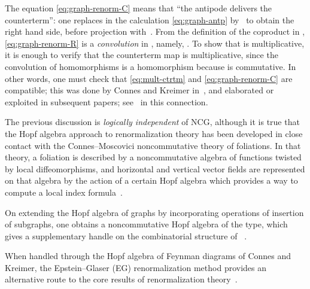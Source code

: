 \documentclass[a4paper,12pt]{article}
\providecommand{\A}{\mathcal{A}}        %
\DeclareMathOperator{\Hom}{Hom}     %
\providecommand{\1}{\mathbf{1}}         %
\providecommand{\7}{\dagger}            %
\providecommand{\8}{\bullet}            %
\renewcommand{\.}{\cdot}            %
\renewcommand{\:}{\colon}           %
\begin{document}
The equation \eqref{eq:graph-renorm-C} means that ``the antipode
delivers the counterterm'': one replaces \coordHE{} in the calculation
\eqref{eq:graph-antp} by~\coordHE{} to obtain the right hand side, before
projection with~\coordHE{}. From the definition of the coproduct in \coordHE{},
\eqref{eq:graph-renorm-R} is a \textit{convolution} in
\myHighlight{$\Hom(H_\Phi,\A)$}\coordHE{}, namely, \coordHE{}. To show that \coordHE{} is
multiplicative, it is enough to verify that the counterterm map \coordHE{} is
multiplicative, since the convolution of homomorphisms is a
homomorphism because \myHighlight{$\A$}\coordHE{} is commutative. In other words, one must
check that \eqref{eq:mult-ctrtm} and \eqref{eq:graph-renorm-C} are
compatible; this was done by Connes and Kreimer in~\cite{ConnesKrRHI},
and elaborated or exploited in subsequent papers; see~\cite{GirelliMK}
in this connection.

The previous discussion is \textit{logically independent} of NCG,
although it is true that the Hopf algebra approach to renormalization
theory has been developed in close contact with the Connes--Moscovici
noncommutative theory of foliations. In that theory, a foliation is
described by a noncommutative algebra of functions twisted by local
diffeomorphisms, and horizontal and vertical vector fields are
represented on that algebra by the action of a certain Hopf algebra
\coordHE{} which provides a way to compute a local index
formula~\cite{ConnesMHopf}.

On extending the Hopf algebra \coordHE{} of
graphs by incorporating operations of insertion of subgraphs, one
obtains a noncommutative Hopf algebra of the \coordHE{} type, which
gives a supplementary handle on the combinatorial structure of
\coordHE{}~\cite{ConnesKrLie}.

\smallskip
When handled through the Hopf algebra of Feynman
diagrams \coordHE{} of Connes and Kreimer, the Epstein--Glaser (EG)
renormalization method provides an alternative route to the core
results of renormalization theory~\cite{PinterSmat,PinterHopf}.
\end{document}

